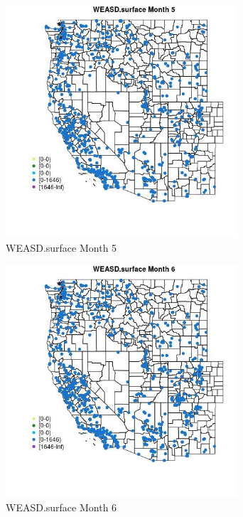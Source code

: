 \begin{figure} 
\centering  
\includegraphics[width=0.77\textwidth]{Code_Outputs/Report_ML_input_PM25_Step4_part_f_de_duplicated_aveswNAs_MapObsMo5WEASDsurface.jpg} 
\caption{\label{fig:Report_ML_input_PM25_Step4_part_f_de_duplicated_aveswNAsMapObsMo5WEASDsurface}WEASD.surface Month 5} 
\end{figure} 
 

\begin{figure} 
\centering  
\includegraphics[width=0.77\textwidth]{Code_Outputs/Report_ML_input_PM25_Step4_part_f_de_duplicated_aveswNAs_MapObsMo6WEASDsurface.jpg} 
\caption{\label{fig:Report_ML_input_PM25_Step4_part_f_de_duplicated_aveswNAsMapObsMo6WEASDsurface}WEASD.surface Month 6} 
\end{figure} 
 

